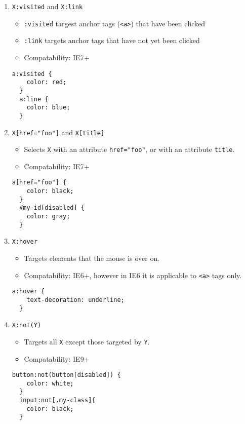 \documentclass[12pt]{article}
\begin{document}
\begin{enumerate}
\item {\texttt{X:visited} and \texttt{X:link}}
  \begin{itemize}
    \item \texttt{:visited} targest anchor tags (\texttt{<a>}) that have been clicked
    \item \texttt{:link} targets anchor tags that have not yet been clicked
    \item Compatability: IE7+
  \end{itemize}
  \begin{lstlisting}[frame=single]
  a:visited {
    color: red;
  }
  a:line {
    color: blue;
  }
  \end{lstlisting}

\item {\texttt{X[href="foo"]} and \texttt{X[title]}}
  \begin{itemize}
    \item Selects \texttt{X} with an attribute \texttt{href="foo"}, or with an attribute \texttt{title}.
    \item Compatability: IE7+
  \end{itemize}
  \begin{lstlisting}[frame=single]
  a[href="foo"] {
    color: black;
  }
  #my-id[disabled] {
    color: gray;
  }
  \end{lstlisting}

\item {\texttt{X:hover}}
  \begin{itemize}
    \item Targets elements that the mouse is over on.
    \item Compatability: IE6+, however in IE6 it is applicable to \texttt{<a>} tags only.
  \end{itemize}
  \begin{lstlisting}[frame=single]
  a:hover {
    text-decoration: underline;
  }
  \end{lstlisting}

\item {\texttt{X:not(Y)}}
  \begin{itemize}
    \item Targets all \texttt{X} except those targeted by \texttt{Y}.
    \item Compatability: IE9+
  \end{itemize}
  \begin{lstlisting}[frame=single]
  button:not(button[disabled]) {
    color: white;
  }
  input:not[.my-class]{
    color: black;
  }
  \end{lstlisting}


\end{enumerate}
\end{document}

